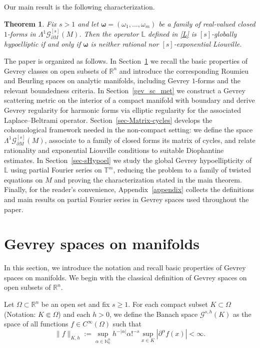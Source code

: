 \documentclass[11pt,reqno]{amsart}
\numberwithin{equation}{section}
\newtheorem{theorem}{Theorem}[section]
\begin{document}
	Our main result is the following characterization.
	
	\begin{theorem}
		Fix $s>1$ and let $\boldsymbol{\omega}=(\omega_1,\dots,\omega_m)$ be a family of real-valued closed $1$-forms in $\mathsf{\Lambda}^1\mathscr{G}^{[s]}_{\partial M}(M)$. 
		Then the operator $\mathbb{L}$ defined in \eqref{L} is $[s]$-globally hypoelliptic if and only if $\boldsymbol{\omega}$ is neither rational nor $[s]$-exponential Liouville.
	\end{theorem}
	
	The paper is organized as follows. In Section~\ref{sec-GSmanif} we recall the basic properties of Gevrey classes on open subsets of $\mathbb{R}^n$ and introduce the corresponding Roumieu and Beurling spaces on analytic manifolds, including Gevrey $1$-forms and the relevant boundedness criteria. In Section~\ref{gev_sc_met} we construct a Gevrey scattering metric on the interior of a compact manifold with boundary and derive Gevrey regularity for harmonic forms via elliptic regularity for the associated Laplace--Beltrami operator. Section~\ref{sec-Matrix-cycles} develops the cohomological framework needed in the non-compact setting: we define the space $\mathsf{\Lambda}^1\mathscr{G}^{[s]}_{\partial M}(M)$, associate to a family of closed forms its matrix of cycles, and relate rationality and exponential Liouville conditions to suitable Diophantine estimates. In Section~\ref{sec-sHypoel} we study the global Gevrey hypoellipticity of $\mathbb{L}$ using partial Fourier series on $\mathbb{T}^m$, reducing the problem to a family of twisted equations on $M$ and proving the characterization stated in the main theorem. Finally, for the reader's convenience, Appendix~\ref{appendix} collects the definitions and main results on partial Fourier series in Gevrey spaces used throughout the paper.
	
	
	
	\section{Gevrey spaces on manifolds}\label{sec-GSmanif}
	
	In this section, we introduce the notation and recall basic properties of Gevrey spaces on manifolds. We begin with the classical definition of Gevrey spaces on open subsets of $\mathbb{R}^n$.
	
	Let $\Omega \subset \mathbb{R}^n$ be an open set and fix $s \geq 1$. For each compact subset $K\subset\Omega$ (Notation: $K \Subset \Omega$) and each $h > 0$, we define the Banach space $\mathscr{G}^{s,h}(K)$ as the space of all functions $f \in C^\infty(\Omega)$ such that
	\[
	\|f\|_{K,h} := \sup_{\alpha \in \mathbb{N}_0^n} h^{-|\alpha|} \alpha!^{-s} 
	\sup_{x \in K} |\partial^\alpha f(x)| < \infty.
	\]
	
\end{document}
